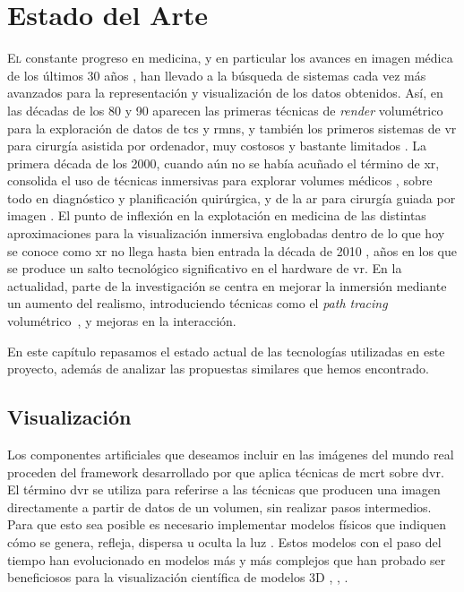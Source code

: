 \chapter{Estado del Arte}
\label{chap:ea}

\lettrine{E}{l} constante progreso en medicina, y en particular los avances en imagen médica de los últimos 30 años \cite{Botha2014}, han llevado a la búsqueda de sistemas cada vez más avanzados para la representación y visualización de los datos obtenidos. Así, en las décadas de los 80 y 90 aparecen las primeras técnicas de \emph{render} volumétrico~\cite{levoy88} para la exploración de datos de \glspl{tc} y \glspl{rmn}, y también los primeros sistemas de \gls{vr} para cirurgía asistida por ordenador, muy costosos y bastante limitados \cite{satava93}. La primera década de los 2000, cuando aún no se había acuñado el término de \gls{xr}, consolida el uso de técnicas inmersivas para explorar volumes médicos \cite{Koning09}, sobre todo en diagnóstico y planificación quirúrgica, y de la \gls{ar} para cirurgía guiada por imagen \cite{Sielhorst2008}. El punto de inflexión en la explotación en medicina de las distintas aproximaciones para la visualización inmersiva englobadas dentro de lo que hoy se conoce como \acrfull{xr} no llega hasta bien entrada la década de 2010 \cite{Egger17, Venkatesan21}, años en los que se produce un salto tecnológico significativo en el hardware de \gls{vr}. En la actualidad, parte de la investigación se centra en mejorar la inmersión mediante un aumento del realismo, introduciendo técnicas como el \emph{path tracing} volumétrico~\cite{Taibo24}, y mejoras en la interacción.

En este capítulo repasamos el estado actual de las tecnologías utilizadas en este proyecto, además de analizar las propuestas similares que hemos encontrado.

\section{Visualización}
Los componentes artificiales que deseamos incluir en las imágenes del mundo real proceden del framework desarrollado por \citeauthor{Kroes2012} que aplica técnicas de \acrfull{mcrt} sobre \acrfull{dvr}.
El término \acrshort{dvr} se utiliza para referirse a las técnicas que producen una imagen directamente a partir de datos de un volumen, sin realizar pasos intermedios. Para que esto sea posible es necesario implementar modelos físicos que indiquen cómo se genera, refleja, dispersa u oculta la luz \cite{Max1995}. Estos modelos con el paso del tiempo han evolucionado en modelos más y más complejos que han probado ser beneficiosos para la visualización científica de modelos 3D \cite{Daz2015}, \cite{Englund2016}, \cite{Lindemann2011}.

